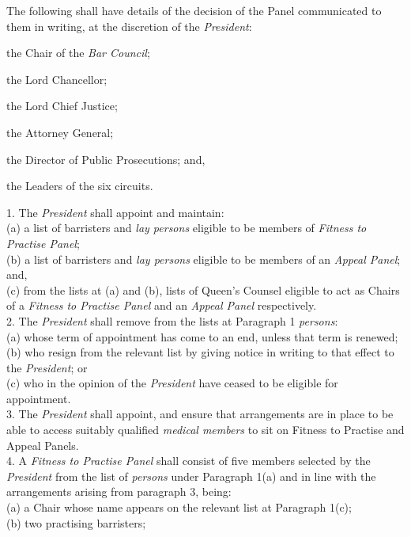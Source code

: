 The following shall have details of the decision of the Panel
communicated to them in writing, at the discretion of
the\emph{ President}:\\\nl \item  the Chair of the \emph{Bar Council};\item the Lord Chancellor;\item the Lord Chief Justice;\item the Attorney General;\item the Director of Public Prosecutions; and,\item the Leaders of the six circuits.\ln
\hspace*{0.333em}\par
{}\par
1. The \emph{President} shall appoint and maintain:\\
(a) a list of barristers and \emph{lay persons} eligible to be members
of \emph{Fitness to Practise Panel};\\
(b) a list of barristers and \emph{lay persons} eligible to be members
of an \emph{Appeal Panel}; and,\\
(c) from the lists at (a) and (b), lists of Queen's Counsel eligible to
act as Chairs of a \emph{Fitness to Practise Panel} and an \emph{Appeal
Panel} respectively. \\
2. The \emph{President} shall remove from the lists at Paragraph
1 \emph{persons}:\\
(a) whose term of appointment has come to an end, unless that term is
renewed;\\
(b) who resign from the relevant list by giving notice in writing to
that effect to the \emph{President}; or\\
(c) who in the opinion of the \emph{President} have ceased to be
eligible for appointment.\\
3. The \emph{President} shall appoint, and ensure that arrangements are
in place to be able to access suitably qualified \emph{medical
members} to sit on Fitness to Practise and Appeal Panels.\\
4. A \emph{Fitness to Practise Panel} shall consist of five members
selected by the \emph{President} from the list of \emph{persons} under
Paragraph 1(a) and in line with the arrangements arising from paragraph
3, being:\\
(a) a Chair whose name appears on the relevant list at Paragraph 1(c);\\
(b) two practising barristers;\\
